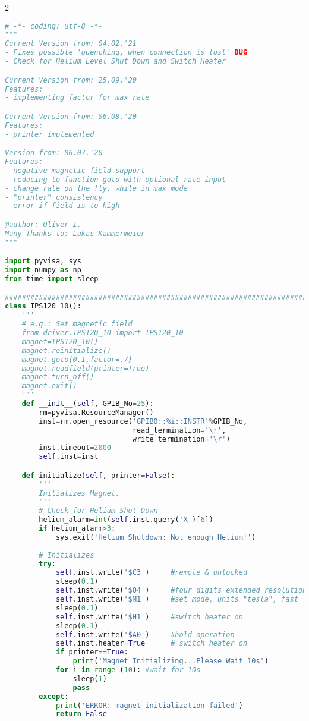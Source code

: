\begin{landscape}
\begin{multicols}{2}
\begin{lstlisting}[language=Python]
# -*- coding: utf-8 -*-
"""
Current Version from: 04.02.'21
- Fixes possible 'quenching, when connection is lost' BUG
- Check for Helium Level Shut Down and Switch Heater

Current Version from: 25.09.'20
Features:
- implementing factor for max rate

Current Version from: 06.08.'20
Features:
- printer implemented

Version from: 06.07.'20
Features:
- negative magnetic field support
- reducing to function goto with optional rate input
- change rate on the fly, while in max mode
- "printer" consistency
- error if field is to high

@author: Oliver I.
Many Thanks to: Lukas Kammermeier
"""

import pyvisa, sys
import numpy as np
from time import sleep

##############################################################################
class IPS120_10():
    '''
    # e.g.: Set magnetic field
    from driver.IPS120_10 import IPS120_10
    magnet=IPS120_10()
    magnet.reinitialize()
    magnet.goto(0.1,factor=.7)
    magnet.readfield(printer=True)
    magnet.turn_off()
    magnet.exit()
    '''
    def __init__(self, GPIB_No=25):
        rm=pyvisa.ResourceManager()
        inst=rm.open_resource('GPIB0::%i::INSTR'%GPIB_No,
                              read_termination='\r',
                              write_termination='\r')
        inst.timeout=2000
        self.inst=inst        

    def initialize(self, printer=False):
        '''
        Initializes Magnet.
        '''
        # Check for Helium Shut Down
        helium_alarm=int(self.inst.query('X')[6])
        if helium_alarm>3:
            sys.exit('Helium Shutdown: Not enough Helium!')
            
        # Initializes
        try:
            self.inst.write('$C3')     #remote & unlocked        
            sleep(0.1)
            self.inst.write('$Q4')     #four digits extended resolution            
            self.inst.write('$M1')     #set mode, units "tesla", fast   
            sleep(0.1)
            self.inst.write('$H1')     #switch heater on
            sleep(0.1)
            self.inst.write('$A0')     #hold operation
            self.inst.heater=True      # switch heater on
            if printer==True:
                print('Magnet Initializing...Please Wait 10s')
            for i in range (10): #wait for 10s
                sleep(1)
                pass
        except:
            print('ERROR: magnet initialization failed')
            return False
        

\end{lstlisting}
\end{multicols}
\end{landscape}

